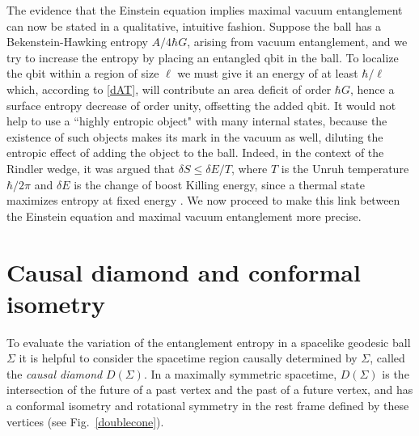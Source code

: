 \documentclass[aps,prd,showpacs,groupedaddress,nofootinbib,longbibliography,12pt]{revtex4-1}
\def\d{\delta}\def\D{\Delta}
\begin{document}
The evidence that the Einstein equation implies 
maximal vacuum entanglement can now be stated in a qualitative, intuitive fashion. 
Suppose the ball has a Bekenstein-Hawking entropy $A/4\hbar G$, arising from vacuum entanglement, and we try to increase
the entropy by placing an entangled qbit in the ball. 
To localize the qbit within a region of size $\ell$ we must give it an energy of
at least $\hbar/\ell$ which, according to \eqref{dAT}, will contribute an area deficit of order 
$\hbar G$, hence a surface entropy decrease of order unity, offsetting the
added qbit. It would not help to use a ``highly entropic object" with many internal states, because the existence of such objects makes its mark in
the vacuum as well, diluting the entropic effect of adding the object to the ball. Indeed, in the context of the Rindler wedge, it was argued that $\delta S \le \delta E/T$, where $T$ is the Unruh temperature $\hbar/2\pi$ and $\d E$ is the change of boost Killing energy, since a thermal state maximizes entropy at fixed energy \cite{Marolf:2003sq, Marolf:2004et}.
We now proceed to make this link between the Einstein equation and maximal vacuum entanglement more precise.


\section{Causal diamond and conformal isometry}

To evaluate the variation of the entanglement entropy in a spacelike geodesic ball $\Sigma$ 
it is helpful to consider the spacetime region causally determined by $\Sigma$,
called the {\it causal diamond} $D(\Sigma)$. 
In a maximally symmetric spacetime, $D(\Sigma)$
is the intersection of the future of a past vertex and the past of a future vertex,
and has a conformal isometry and rotational symmetry in the rest frame defined by these vertices
(see Fig.~\ref{doublecone}). 
\end{document}
